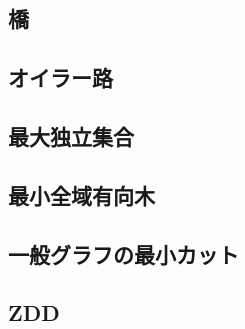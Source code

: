 \subsection{橋}


\subsection{オイラー路}


\subsection{最大独立集合}


\subsection{最小全域有向木}


\subsection{一般グラフの最小カット}


\subsection{ZDD}

